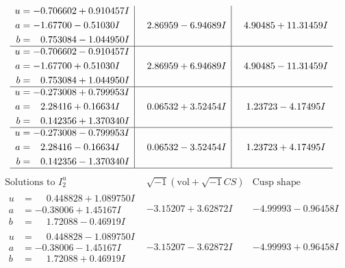 \documentclass[1p]{elsarticle_modified}
\theoremstyle{definition}
\newcommand{\I}{\sqrt{-1}}
\begin{document}
$$\begin{array}{c|c|c}
\begin{aligned}
u &= -0.706602 + 0.910457 I \\
a &= -1.67700 - 0.51030 I \\
b &= \phantom{-}0.753084 - 1.044950 I\end{aligned}
 & \phantom{-}2.86959 - 6.94689 I & \phantom{-}4.90485 + 11.31459 I \\ \hline\begin{aligned}
u &= -0.706602 - 0.910457 I \\
a &= -1.67700 + 0.51030 I \\
b &= \phantom{-}0.753084 + 1.044950 I\end{aligned}
 & \phantom{-}2.86959 + 6.94689 I & \phantom{-}4.90485 - 11.31459 I \\ \hline\begin{aligned}
u &= -0.273008 + 0.799953 I \\
a &= \phantom{-}2.28416 + 0.16634 I \\
b &= \phantom{-}0.142356 + 1.370340 I\end{aligned}
 & \phantom{-}0.06532 + 3.52454 I & \phantom{-}1.23723 - 4.17495 I \\ \hline\begin{aligned}
u &= -0.273008 - 0.799953 I \\
a &= \phantom{-}2.28416 - 0.16634 I \\
b &= \phantom{-}0.142356 - 1.370340 I\end{aligned}
 & \phantom{-}0.06532 - 3.52454 I & \phantom{-}1.23723 + 4.17495 I\\
 \hline 
 \end{array}$$\newpage$$\begin{array}{c|c|c}  
\text{Solutions to }I^u_{2}& \I (\text{vol} + \sqrt{-1}CS) & \text{Cusp shape}\\
 \hline 
\begin{aligned}
u &= \phantom{-}0.448828 + 1.089750 I \\
a &= -0.38006 + 1.45167 I \\
b &= \phantom{-}1.72088 - 0.46919 I\end{aligned}
 & -3.15207 + 3.62872 I & -4.99993 - 0.96458 I \\ \hline\begin{aligned}
u &= \phantom{-}0.448828 - 1.089750 I \\
a &= -0.38006 - 1.45167 I \\
b &= \phantom{-}1.72088 + 0.46919 I\end{aligned}
 & -3.15207 - 3.62872 I & -4.99993 + 0.96458 I \\ \hline\begin{aligned}

\end{aligned}
\end{array}$$
\end{document}
